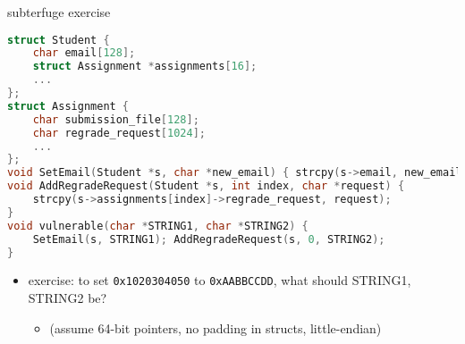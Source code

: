 \begin{frame}[fragile,label=subterExer]{subterfuge exercise}
\begin{lstlisting}[language=C++,style=script]
struct Student {
    char email[128];
    struct Assignment *assignments[16];
    ...
};
struct Assignment {
    char submission_file[128];
    char regrade_request[1024];
    ...
};
void SetEmail(Student *s, char *new_email) { strcpy(s->email, new_email); }
void AddRegradeRequest(Student *s, int index, char *request) {
    strcpy(s->assignments[index]->regrade_request, request);
}
void vulnerable(char *STRING1, char *STRING2) {
    SetEmail(s, STRING1); AddRegradeRequest(s, 0, STRING2);
}
\end{lstlisting}
\begin{itemize}
\item exercise: to set \texttt{0x1020304050} to \texttt{0xAABBCCDD}, what should STRING1, STRING2 be?
    \begin{itemize}
    \item (assume 64-bit pointers, no padding in structs, little-endian)
    \end{itemize}
\end{itemize}
\end{frame}
